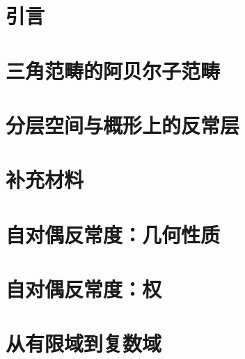 \documentclass[UTF8,fontset=none,zihao=-4,twoside,openany]{ctexbook}
\begin{document}

\frontmatter

\tableofcontents

\mainmatter
\setcounter{chapter}{-1}
\chapter{引言}

\chapter{三角范畴的阿贝尔子范畴}


\chapter{分层空间与概形上的反常层}

\chapter{补充材料}

\chapter{自对偶反常度：几何性质}

\chapter{自对偶反常度：权}

\chapter{从有限域到复数域}

\backmatter




\MakeGlossary
\end{document}
